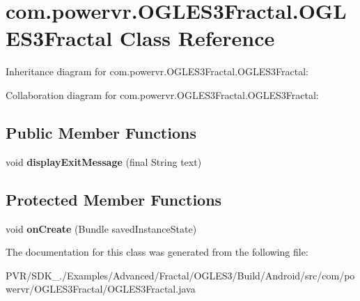 \hypertarget{classcom_1_1powervr_1_1_o_g_l_e_s3_fractal_1_1_o_g_l_e_s3_fractal}{\section{com.\+powervr.\+O\+G\+L\+E\+S3\+Fractal.\+O\+G\+L\+E\+S3\+Fractal Class Reference}
\label{classcom_1_1powervr_1_1_o_g_l_e_s3_fractal_1_1_o_g_l_e_s3_fractal}
}


Inheritance diagram for com.\+powervr.\+O\+G\+L\+E\+S3\+Fractal.\+O\+G\+L\+E\+S3\+Fractal\+:


Collaboration diagram for com.\+powervr.\+O\+G\+L\+E\+S3\+Fractal.\+O\+G\+L\+E\+S3\+Fractal\+:
\subsection*{Public Member Functions}
\begin{DoxyCompactItemize}
\item 
\hypertarget{classcom_1_1powervr_1_1_o_g_l_e_s3_fractal_1_1_o_g_l_e_s3_fractal_a80ffcf5dbee757478407f904e74e424f}{void {\bfseries display\+Exit\+Message} (final String text)}\label{classcom_1_1powervr_1_1_o_g_l_e_s3_fractal_1_1_o_g_l_e_s3_fractal_a80ffcf5dbee757478407f904e74e424f}

\end{DoxyCompactItemize}
\subsection*{Protected Member Functions}
\begin{DoxyCompactItemize}
\item 
\hypertarget{classcom_1_1powervr_1_1_o_g_l_e_s3_fractal_1_1_o_g_l_e_s3_fractal_a02ad50a44c1b6bcc83b9b13766664715}{void {\bfseries on\+Create} (Bundle saved\+Instance\+State)}\label{classcom_1_1powervr_1_1_o_g_l_e_s3_fractal_1_1_o_g_l_e_s3_fractal_a02ad50a44c1b6bcc83b9b13766664715}

\end{DoxyCompactItemize}


The documentation for this class was generated from the following file\+:\begin{DoxyCompactItemize}
\item 
P\+V\+R/\+S\+D\+K\+\_./\+Examples/\+Advanced/\+Fractal/\+O\+G\+L\+E\+S3/\+Build/\+Android/src/com/powervr/\+O\+G\+L\+E\+S3\+Fractal/O\+G\+L\+E\+S3\+Fractal.\+java\end{DoxyCompactItemize}
